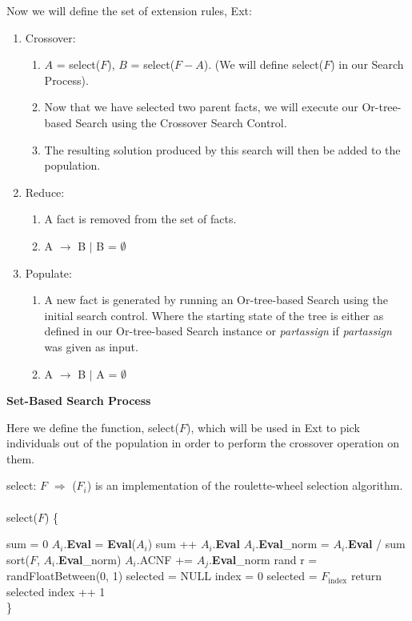 \documentclass[11pt, oneside]{article}   	%
\begin{document}
\noindent Now we will define the set of extension rules, Ext:
\begin{enumerate} [topsep=0pt, itemsep=0pt, leftmargin=*]
\item Crossover:
	\begin{enumerate}[leftmargin=*]
	\item $A$ = select($F$), $B$ = select($F - A$). (We will define select($F$) in our Search Process).
	\item Now that we have selected two parent facts, we will execute our Or-tree-based Search using the Crossover Search Control.
	\item The resulting solution produced by this search will then be added to the population.
	\end{enumerate} 
\item Reduce:
	\begin{enumerate}
	\item A fact is removed from the set of facts.
	\item A $\rightarrow$ B $\vert$ B = $\emptyset$
	\end{enumerate}
\item Populate:
	\begin{enumerate}
	\item A new fact is generated by running an Or-tree-based Search using the initial search control. Where the starting state of the tree is either as defined in our Or-tree-based Search 		instance or \textit{partassign} if \textit{partassign} was given as input.
	\item  A $\rightarrow$ B $\vert$ A = $\emptyset$
	\end{enumerate}
\end{enumerate}

\noindent \textbf{Set-Based Search Process}

\noindent Here we define the function, select($F$), which will be used in Ext to pick individuals out of the population in order to perform the crossover operation on them.

\noindent select: $F$ $\Rightarrow$ ($F_i$) is an implementation of the roulette-wheel selection algorithm.\\\\
select($F$) \{
\begin{algorithmic}[\textfloatsep = 0pt]
    \STATE sum = 0
    	\STATE $A_i$.\textbf{Eval} = \textbf{Eval}($A_i$)
	\STATE sum ++ $A_i$.\textbf{Eval}
    \ENDFOR
    	\STATE $A_i$.\textbf{Eval}_norm = $A_i$.\textbf{Eval} / sum
    \ENDFOR
    \STATE sort($F$, $A_i$.\textbf{Eval}_norm)
    		\STATE $A_i$.ACNF += $A_j$.\textbf{Eval}_norm
    	\ENDFOR
    \ENDFOR
    \STATE rand r = randFloatBetween(0, 1)
    \STATE selected = NULL
    \STATE index = 0
    	\STATE selected = $F_{\text{index}}$
    		\STATE return selected
    	\ENDIF
	\STATE index ++ 1
    \ENDWHILE \\ \}
\end{algorithmic}
\end{document}
